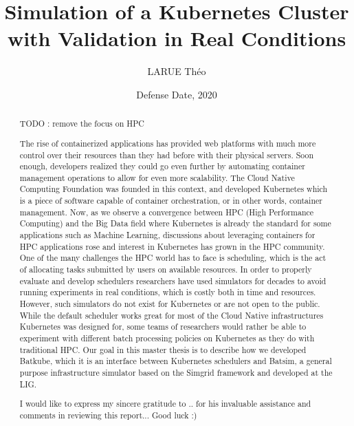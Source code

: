 \documentclass[12pt, a4paper]{memoir}
\title{Simulation of a Kubernetes Cluster with Validation in Real Conditions} %
\author{LARUE Théo}
\date{Defense Date, 2020} %
\begin{document}
\frontmatter
\begin{titlingpage}
\maketitle
\end{titlingpage}

\setlength{\parskip}{-1pt plus 1pt}

\renewcommand{\abstracttextfont}{\normalfont}
\abstractintoc
\begin{abstract} 
	TODO : remove the focus on HPC


	The rise of containerized applications has provided web platforms with
	much more control over their resources than they had before with their
	physical servers. Soon enough, developers realized they could go even
	further by automating container management operations to allow for even
	more scalability. The Cloud Native Computing Foundation was founded in
	this context, and developed Kubernetes which is a piece of software
	capable of container orchestration, or in other words, container
	management. Now, as we observe a convergence between HPC (High
	Performance Computing) and the Big Data field where Kubernetes is
	already the standard for some applications such as Machine Learning,
	discussions about leveraging containers for HPC applications rose and
	interest in Kubernetes has grown in the HPC community. One of the many
	challenges the HPC world has to face is scheduling, which is the act of
	allocating tasks submitted by users on available resources. In order to
	properly evaluate and develop schedulers researchers have used
	simulators for decades to avoid running experiments in real conditions,
	which is costly both in time and resources. However, such simulators do
	not exist for Kubernetes or are not open to the public. While the
	default scheduler works great for most of the Cloud Native
	infrastructures Kubernetes was designed for, some teams of researchers
	would rather be able to experiment with different batch processing
	policies on Kubernetes as they do with traditional HPC. Our goal in
	this master thesis is to describe how we developed Batkube, which it is
	an interface between Kubernetes schedulers and Batsim, a general
	purpose infrastructure simulator based on the Simgrid framework and
	developed at the LIG.

\end{abstract}
\abstractintoc

\renewcommand\abstractname{Acknowledgement}
\begin{abstract}
I would like to express my sincere gratitude to .. for his invaluable assistance and comments in reviewing this report... 
Good luck :) 
\end{abstract}
\end{document}
